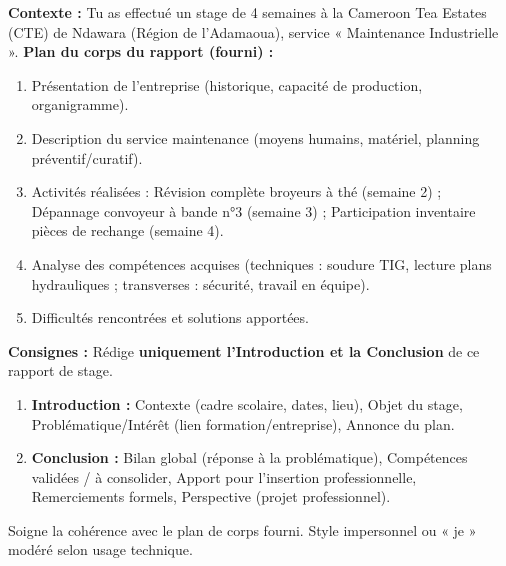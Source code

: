 \documentclass[11pt]{article}
\begin{document}
\begin{exercice}
\textbf{Contexte :} Tu as effectué un stage de 4 semaines à la Cameroon Tea Estates (CTE) de Ndawara (Région de l'Adamaoua), service « Maintenance Industrielle ».
\textbf{Plan du corps du rapport (fourni) :}
\begin{enumerate}
    \item Présentation de l'entreprise (historique, capacité de production, organigramme).
    \item Description du service maintenance (moyens humains, matériel, planning préventif/curatif).
    \item Activités réalisées : Révision complète broyeurs à thé (semaine 2) ; Dépannage convoyeur à bande n°3 (semaine 3) ; Participation inventaire pièces de rechange (semaine 4).
    \item Analyse des compétences acquises (techniques : soudure TIG, lecture plans hydrauliques ; transverses : sécurité, travail en équipe).
    \item Difficultés rencontrées et solutions apportées.
\end{enumerate}
\textbf{Consignes :} Rédige \textbf{uniquement l'Introduction et la Conclusion} de ce rapport de stage.
\begin{enumerate}
    \item \textbf{Introduction :} Contexte (cadre scolaire, dates, lieu), Objet du stage, Problématique/Intérêt (lien formation/entreprise), Annonce du plan.
    \item \textbf{Conclusion :} Bilan global (réponse à la problématique), Compétences validées / à consolider, Apport pour l'insertion professionnelle, Remerciements formels, Perspective (projet professionnel).
\end{enumerate}
Soigne la cohérence avec le plan de corps fourni. Style impersonnel ou « je » modéré selon usage technique.
\end{exercice}
\end{document}
